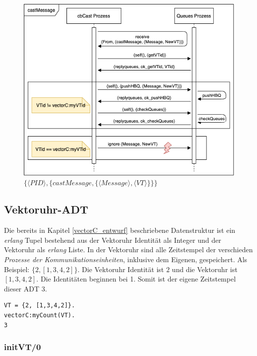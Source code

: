 \begin{figure}[htbp]
\begin{center}
\includegraphics[scale=0.6]{Latex/Bilder/cast_realisierung.png}
\caption{\label{fig:sequence_cast_realisierung} $\{\langle PID \rangle,\{castMessage,\{\langle Message \rangle, \langle VT \rangle\}\}\}$}
\end{center}
\end{figure}

\subsection{Vektoruhr-ADT} \label{vectorC_realisierung}

Die bereits in Kapitel \ref{vectorC_entwurf} beschriebene Datenstruktur ist ein \textit{erlang} Tupel bestehend aus der Vektoruhr Identität als Integer und der Vektoruhr als \textit{erlang} Liste. In der Vektoruhr sind alle Zeitstempel der verschieden \textit{Prozesse der Kommunikationseinheiten}, inklusive dem Eigenen, gespeichert. Als Beispiel: $\{2, [1,3,4,2]\}$. Die Vektoruhr Identität ist $2$ und die Vektoruhr ist $[1,3,4,2]$. Die Identitäten beginnen bei 1. Somit ist der eigene Zeitstempel dieser ADT $3$.

\begin{lstlisting}
VT = {2, [1,3,4,2]}.
vectorC:myCount(VT).
3
\end{lstlisting}

\subsubsection{initVT/0}

